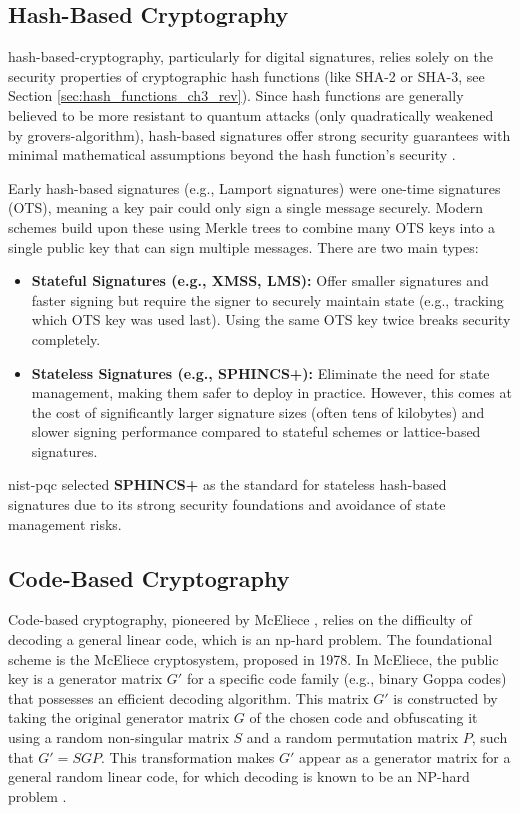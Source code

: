 \subsection{Hash-Based Cryptography}\label{subsec:hash_ch6}
\Gls{hash-based-cryptography}, particularly for digital signatures, relies solely on the security properties of cryptographic hash functions (like SHA-2 or SHA-3, see Section \ref{sec:hash_functions_ch3_rev}). Since hash functions are generally believed to be more resistant to quantum attacks (only quadratically weakened by \gls{grovers-algorithm}), hash-based signatures offer strong security guarantees with minimal mathematical assumptions beyond the hash function's security \parencite{hash_based_advances_2024}.

Early hash-based signatures (e.g., Lamport signatures) were one-time signatures (OTS), meaning a key pair could only sign a single message securely. Modern schemes build upon these using Merkle trees to combine many OTS keys into a single public key that can sign multiple messages. There are two main types:
\begin{itemize}
    \item \textbf{Stateful Signatures (e.g., XMSS, LMS):} Offer smaller signatures and faster signing but require the signer to securely maintain state (e.g., tracking which OTS key was used last). Using the same OTS key twice breaks security completely.
    \item \textbf{Stateless Signatures (e.g., SPHINCS+):} Eliminate the need for state management, making them safer to deploy in practice. However, this comes at the cost of significantly larger signature sizes (often tens of kilobytes) and slower signing performance compared to stateful schemes or lattice-based signatures.
\end{itemize}
\Gls{nist-pqc} selected \textbf{SPHINCS+} as the standard for stateless hash-based signatures due to its strong security foundations and avoidance of state management risks.

\subsection{Code-Based Cryptography}\label{subsec:code_ch6}\label{subsec:code_ch5}
Code-based cryptography, pioneered by McEliece \parencite{mceliece1978public}, relies on the difficulty of decoding a general linear code, which is an \gls{np-hard} problem. The foundational scheme is the McEliece cryptosystem, proposed in 1978. In McEliece, the public key is a generator matrix $G'$ for a specific code family (e.g., binary Goppa codes) that possesses an efficient decoding algorithm. This matrix $G'$ is constructed by taking the original generator matrix $G$ of the chosen code and obfuscating it using a random non-singular matrix $S$ and a random permutation matrix $P$, such that $G' = SGP$. This transformation makes $G'$ appear as a generator matrix for a general random linear code, for which decoding is known to be an NP-hard problem \parencite{bernstein2008introduction}.

